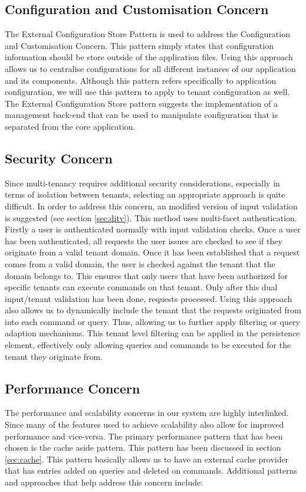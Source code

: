 \subsection{Configuration and Customisation Concern}
The External Configuration Store Pattern is used to address the Configuration and Customisation Concern. This pattern simply states that configuration information should be store outside of the application files. Using this approach allows us to centralise configurations for all different instances of our application and its components. Although this pattern refers specifically to application configuration, we will use this pattern to apply to tenant configuration as well. The External Configuration Store pattern suggests the implementation of a management back-end that can be used to manipulate configuration that is separated from the core application.

\subsection{Security Concern}
Since multi-tenancy requires additional security considerations, especially in terms of isolation between tenants, selecting an appropriate approach is quite difficult. In order to address this concern, an modified version of input validation is suggested (see section \ref{sec:ditv}). This method uses multi-facet authentication. Firstly a user is authenticated normally with input validation checks. Once a user has been authenticated, all requests the user issues are checked to see if they originate from a valid tenant domain. Once it has been established that a request comes from a valid domain, the user is checked against the tenant that the domain belongs to. This ensures that only users that have been authorized for specific tenants can execute commands on that tenant. Only after this dual input/tenant validation has been done, requests processed. Using this approach also allows us to dynamically include the tenant that the requests originated from into each command or query. Thus, allowing us to further apply filtering or query adaption mechanisms. This tenant level filtering can be applied in the persistence element, effectively only allowing queries and commands to be executed for the tenant they originate from. 


\subsection{Performance Concern}
The performance and scalability concerns in our system are highly interlinked. Since many of the features used to achieve scalability also allow for improved performance and vice-versa. The primary performance pattern that has been chosen is the cache aside pattern. This pattern has been discussed in section \ref{sec:cache}. This pattern basically allows us to have an external cache provider that has entries added on queries and deleted on commands. Additional patterns and approaches that help address this concern include:

